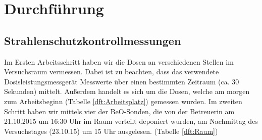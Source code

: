 \section{Durchführung}

\subsection{Strahlenschutzkontrollmessungen}
Im Ersten Arbeitsschritt haben wir die Dosen an verschiedenen Stellen im Versuchsraum vermessen. Dabei ist zu beachten, dass das verwendete Dosisleistungsmessgerät Messwerte über einen bestimmten Zeitraum (ca. 30 Sekunden) mittelt. Außerdem handelt es sich um die Dosen, welche am morgen zum Arbeitsbeginn (Tabelle \ref{dft:Arbeitsplatz}) gemessen wurden. 
Im zweiten Schritt haben wir mittels vier der BeO-Sonden, die von der Betreuerin am 21.10.2015 um 16:30 Uhr im Raum verteilt deponiert wurden, am Nachmittag des Versuchstages (23.10.15) um 15 Uhr ausgelesen. (Tabelle \ref{dft:Raum}) \\
	
